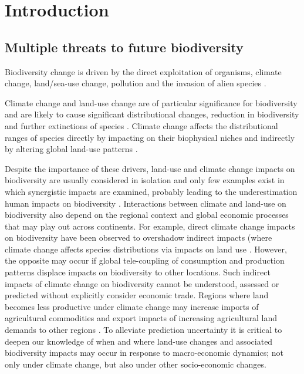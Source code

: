 \section{Introduction}

\subsection{Multiple threats to future biodiversity}

Biodiversity change is driven by the direct exploitation of organisms, climate change, land/sea-use change, pollution and the invasion of alien species \citep{ipbes_summary_2019}.

Climate change and land-use change are of particular significance for biodiversity and are likely to cause significant distributional changes, reduction in biodiversity and further extinctions of species \citep{ipbes_summary_2019, struebig_targeted_2015, newbold2019climate, kapitza_assessing_2021, foley_global_2005}. Climate change affects the distributional ranges of species directly by impacting on their biophysical niches and indirectly by altering global land-use patterns \citep{kapitza_assessing_2021}. 

Despite the importance of these drivers, land-use and climate change impacts on biodiversity are usually considered in isolation and only few examples exist in which synergistic impacts are examined, probably leading to the underestimation human impacts on biodiversity \citep{de_chazal_land-use_2009}. Interactions between climate and land-use on biodiversity also depend on the regional context and global economic processes that may play out across continents. For example, direct climate change impacts on biodiversity have been observed to overshadow indirect impacts (where climate change affects species distributions via impacts on land use \citep[,][]{kapitza_assessing_2021}. However, the opposite may occur if global tele-coupling of consumption and production patterns displace impacts on biodiversity to other locations. Such indirect impacts of climate change on biodiversity cannot be understood, assessed or predicted without explicitly consider economic trade. Regions where land becomes less productive under climate change may increase imports of agricultural commodities and export impacts of increasing agricultural land demands to other regions \citep{kapitza_assessing_2021, chaudhary_land_2016}. To alleviate prediction uncertainty it is critical to deepen our knowledge of when and where land-use changes and associated biodiversity impacts may occur in response to macro-economic dynamics; not only under climate change, but also under other socio-economic changes.

